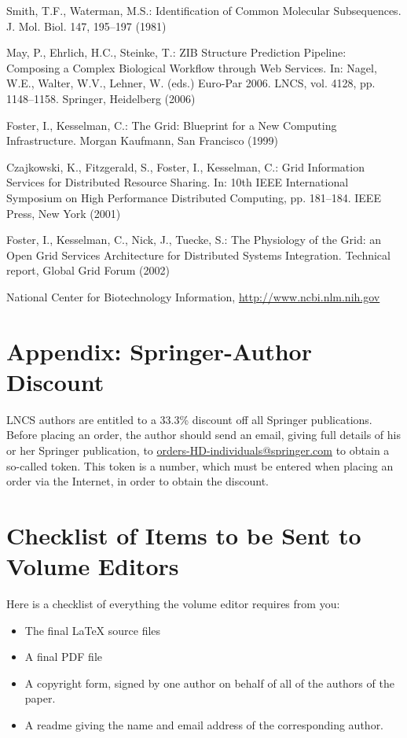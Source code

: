 \documentclass[runningheads,a4paper]{llncs}
\begin{document}
\begin{thebibliography}{4}

 Smith, T.F., Waterman, M.S.: Identification of Common Molecular
Subsequences. J. Mol. Biol. 147, 195--197 (1981)

 May, P., Ehrlich, H.C., Steinke, T.: ZIB Structure Prediction Pipeline:
Composing a Complex Biological Workflow through Web Services. In: Nagel,
W.E., Walter, W.V., Lehner, W. (eds.) Euro-Par 2006. LNCS, vol. 4128,
pp. 1148--1158. Springer, Heidelberg (2006)

 Foster, I., Kesselman, C.: The Grid: Blueprint for a New Computing
Infrastructure. Morgan Kaufmann, San Francisco (1999)

 Czajkowski, K., Fitzgerald, S., Foster, I., Kesselman, C.: Grid
Information Services for Distributed Resource Sharing. In: 10th IEEE
International Symposium on High Performance Distributed Computing, pp.
181--184. IEEE Press, New York (2001)

 Foster, I., Kesselman, C., Nick, J., Tuecke, S.: The Physiology of the
Grid: an Open Grid Services Architecture for Distributed Systems
Integration. Technical report, Global Grid Forum (2002)

 National Center for Biotechnology Information, \url{http://www.ncbi.nlm.nih.gov}

\end{thebibliography}


\section*{Appendix: Springer-Author Discount}

LNCS authors are entitled to a 33.3\% discount off all Springer
publications. Before placing an order, the author should send an email, 
giving full details of his or her Springer publication,
to \url{orders-HD-individuals@springer.com} to obtain a so-called token. This token is a
number, which must be entered when placing an order via the Internet, in
order to obtain the discount.

\section{Checklist of Items to be Sent to Volume Editors}
Here is a checklist of everything the volume editor requires from you:


\begin{itemize}
\settowidth{\leftmargin}{{\Large$\square$}}\advance\leftmargin{}
\itemsep8pt\relax
\renewcommand\labelitemi{{\lower1.5pt\hbox{\Large$\square$}}}

\item The final \LaTeX{} source files
\item A final PDF file
\item A copyright form, signed by one author on behalf of all of the
authors of the paper.
\item A readme giving the name and email address of the
corresponding author.
\end{itemize}
\end{document}
